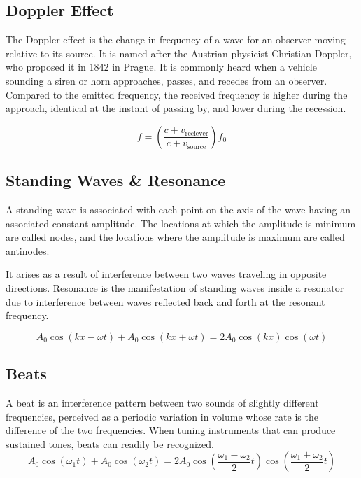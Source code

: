 \subsection{Doppler Effect}
The Doppler effect is the change in frequency of a wave for an observer moving relative to its source. It is named after the Austrian physicist Christian Doppler, who proposed it in 1842 in Prague. It is commonly heard when a vehicle sounding a siren or horn approaches, passes, and recedes from an observer. Compared to the emitted frequency, the received frequency is higher during the approach, identical at the instant of passing by, and lower during the recession.

$$f = \left ( \frac {c+v_\text{reciever}}{c + v_\text{source}} \right ) f_0$$
\subsection{Standing Waves \& Resonance}
A standing wave is associated with each point on the axis of the wave having an associated constant amplitude. The locations at which the amplitude is minimum are called nodes, and the locations where the amplitude is maximum are called antinodes.

It arises as a result of interference between two waves traveling in opposite directions.  Resonance is the manifestation of standing waves inside a resonator due to interference between waves reflected back and forth at the resonant frequency.

$$A_0\cos(kx-\omega t)+A_0\cos(kx+\omega t)=2A_0 \cos(kx)\cos(\omega t)$$

\subsection{Beats}
A beat is an interference pattern between two sounds of slightly different frequencies, perceived as a periodic variation in volume whose rate is the difference of the two frequencies.  When tuning instruments that can produce sustained tones, beats can readily be recognized. 
$$A_0\cos(\omega_1 t)+A_0\cos(\omega_2 t)=2A_0 \cos(\frac{\omega_1-\omega_2}{2}t)\cos(\frac{\omega_1+\omega_2}{2}t)$$
